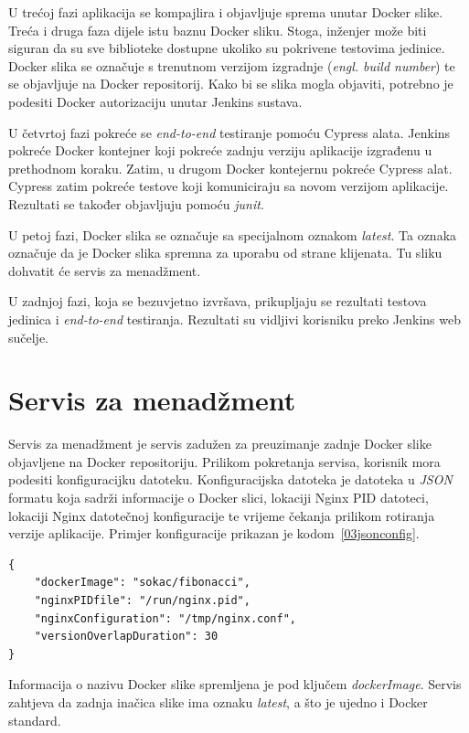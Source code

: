 U trećoj fazi aplikacija se kompajlira i objavljuje sprema unutar Docker slike. Treća i druga faza
dijele istu baznu Docker sliku. Stoga, inženjer može biti siguran da su sve biblioteke dostupne
ukoliko su pokrivene testovima jedinice. Docker slika se označuje s trenutnom verzijom izgradnje
(\textit{engl. build number}) te se objavljuje na Docker repositorij. Kako bi se slika mogla
objaviti, potrebno je podesiti Docker autorizaciju unutar Jenkins sustava.

U četvrtoj fazi pokreće se \textit{end-to-end} testiranje pomoću Cypress alata. Jenkins pokreće
Docker kontejner koji pokreće zadnju verziju aplikacije izgrađenu u prethodnom koraku. Zatim, u
drugom Docker kontejernu pokreće Cypress alat. Cypress zatim pokreće testove koji komuniciraju sa
novom verzijom aplikacije. Rezultati se također objavljuju pomoću \textit{junit}.

U petoj fazi, Docker slika se označuje sa specijalnom oznakom \textit{latest}. Ta oznaka označuje
da je Docker slika spremna za uporabu od strane klijenata. Tu sliku dohvatit će servis za
menadžment.

U zadnjoj fazi, koja se bezuvjetno izvršava, prikupljaju se rezultati testova jedinica i
\textit{end-to-end} testiranja. Rezultati su vidljivi korisniku preko Jenkins web sučelje.

\section{Servis za menadžment}
Servis za menadžment je servis zadužen za preuzimanje zadnje Docker slike objavljene na
Docker repositoriju. Prilikom pokretanja servisa, korisnik mora podesiti konfiguracijku datoteku.
Konfiguracijska datoteka je datoteka u \textit{JSON} formatu koja sadrži informacije o Docker slici,
lokaciji Nginx PID datoteci, lokaciji Nginx datotečnoj konfiguracije te vrijeme čekanja prilikom
rotiranja verzije aplikacije. Primjer konfiguracije prikazan je kodom~\ref{03jsonconfig}.

\begin{lstlisting}[float=h]
{
    "dockerImage": "sokac/fibonacci",
    "nginxPIDfile": "/run/nginx.pid",
    "nginxConfiguration": "/tmp/nginx.conf",
    "versionOverlapDuration": 30
}

\end{lstlisting}

Informacija o nazivu Docker slike spremljena je pod ključem \textit{dockerImage}. Servis
zahtjeva da zadnja inačica slike ima oznaku \textit{latest}, a što je ujedno i Docker standard.

